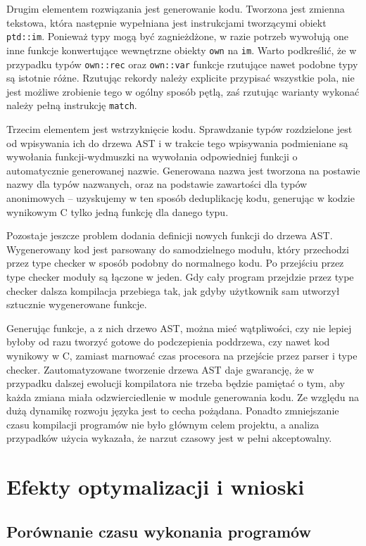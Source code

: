 \documentclass[licencjacka]{pracamgr}
\begin{document}
Drugim elementem rozwiązania jest generowanie kodu. Tworzona jest zmienna tekstowa, która następnie wypełniana jest instrukcjami tworzącymi obiekt \texttt{ptd::im}.
Ponieważ typy mogą być zagnieżdżone, w razie potrzeb wywołują one inne funkcje konwertujące wewnętrzne obiekty \texttt{own} na \texttt{im}.
Warto podkreślić, że w przypadku typów \texttt{own::rec} oraz \texttt{own::var} funkcje rzutujące nawet podobne typy są istotnie różne.
Rzutując rekordy należy explicite przypisać wszystkie pola, nie jest możliwe zrobienie tego w ogólny sposób pętlą, zaś rzutując warianty
wykonać należy pełną instrukcję \texttt{match}.

Trzecim elementem jest wstrzyknięcie kodu. Sprawdzanie typów rozdzielone jest od wpisywania ich do drzewa AST
i w trakcie tego wpisywania podmieniane są wywołania funkcji-wydmuszki na wywołania
odpowiedniej funkcji o automatycznie generowanej nazwie. Generowana nazwa jest tworzona na postawie nazwy dla typów nazwanych, oraz na podstawie zawartości
dla typów anonimowych -- uzyskujemy w ten sposób deduplikację kodu, generując w kodzie wynikowym C tylko jedną funkcję dla danego typu.

Pozostaje jeszcze problem dodania definicji nowych funkcji do drzewa AST. Wygenerowany kod jest parsowany do samodzielnego modułu,
który przechodzi przez type checker w sposób podobny do normalnego kodu. Po przejściu przez type checker moduły są łączone w jeden. Gdy cały program przejdzie przez type checker
dalsza kompilacja przebiega tak, jak gdyby użytkownik sam utworzył sztucznie wygenerowane funkcje.

Generując funkcje, a z nich drzewo AST, można mieć wątpliwości, czy nie lepiej byłoby od razu tworzyć gotowe do podczepienia poddrzewa, czy nawet kod wynikowy w C,
zamiast marnować czas procesora na przejście przez parser i type checker. 
Zautomatyzowane tworzenie drzewa AST daje gwarancję, że w przypadku dalszej ewolucji kompilatora nie trzeba będzie pamiętać o tym,
aby każda zmiana miała odzwierciedlenie w module generowania kodu. Ze względu na dużą dynamikę rozwoju języka jest to cecha pożądana.
Ponadto zmniejszanie czasu kompilacji programów nie było głównym celem projektu, a analiza przypadków użycia wykazała, że narzut czasowy jest w pełni akceptowalny.

\chapter{Efekty optymalizacji i wnioski}
\section{Porównanie czasu wykonania programów}
\end{document}
